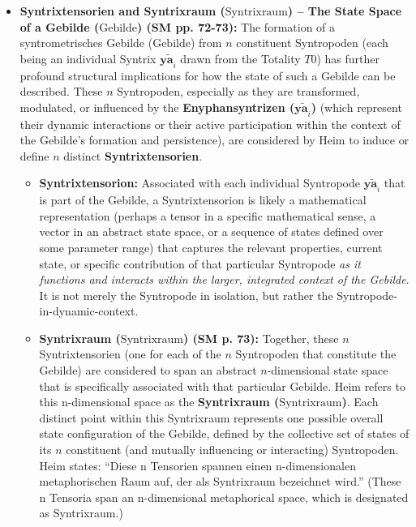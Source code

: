 \documentclass[12pt]{article}
\newcommand{\q}[1]{\enquote{#1}}
\newcommand{\syntrix}{\bm{y\widetilde{a}}}
\newcommand{\syntrixtotalitaet}{T0}
\newcommand{\diskreteEnyphansyntrix}{\bm{y\widetilde{a}}}
\newcommand{\syntrometrischesGebilde}{\text{Gebilde}}
\newcommand{\syntrixraum}{\text{Syntrixraum}}
\begin{document}
\begin{itemize}
    \item \textbf{Syntrixtensorien and Syntrixraum (\(\syntrixraum\)) – The State Space of a Gebilde (\(\syntrometrischesGebilde\)) (SM pp. 72-73):}
    The formation of a syntrometrisches Gebilde (\(\syntrometrischesGebilde\)) from \( n \) constituent Syntropoden (each being an individual Syntrix \( \syntrix_i \) drawn from the Totality \( \syntrixtotalitaet \)) has further profound structural implications for how the state of such a Gebilde can be described. These \( n \) Syntropoden, especially as they are transformed, modulated, or influenced by the \textbf{Enyphansyntrizen (\( \diskreteEnyphansyntrix_i \))} (which represent their dynamic interactions or their active participation within the context of the Gebilde's formation and persistence), are considered by Heim to induce or define \( n \) distinct \textbf{Syntrixtensorien}.
    \begin{itemize}
        \item \textbf{Syntrixtensorion:} Associated with each individual Syntropode \( \syntrix_i \) that is part of the Gebilde, a Syntrixtensorion is likely a mathematical representation (perhaps a tensor in a specific mathematical sense, a vector in an abstract state space, or a sequence of states defined over some parameter range) that captures the relevant properties, current state, or specific contribution of that particular Syntropode \textit{as it functions and interacts within the larger, integrated context of the Gebilde}. It is not merely the Syntropode in isolation, but rather the Syntropode-in-dynamic-context.
        \item \textbf{Syntrixraum (\(\syntrixraum\)) (SM p. 73):} Together, these \( n \) Syntrixtensorien (one for each of the \( n \) Syntropoden that constitute the Gebilde) are considered to span an abstract \( n \)-dimensional state space that is specifically associated with that particular Gebilde. Heim refers to this n-dimensional space as the \textbf{Syntrixraum (\(\syntrixraum\))}. Each distinct point within this Syntrixraum represents one possible overall state configuration of the Gebilde, defined by the collective set of states of its \( n \) constituent (and mutually influencing or interacting) Syntropoden. Heim states: \q{Diese n Tensorien spannen einen n-dimensionalen metaphorischen Raum auf, der als Syntrixraum bezeichnet wird.} (These n Tensoria span an n-dimensional metaphorical space, which is designated as Syntrixraum.)
    \end{itemize}


\end{itemize}
\end{document}
